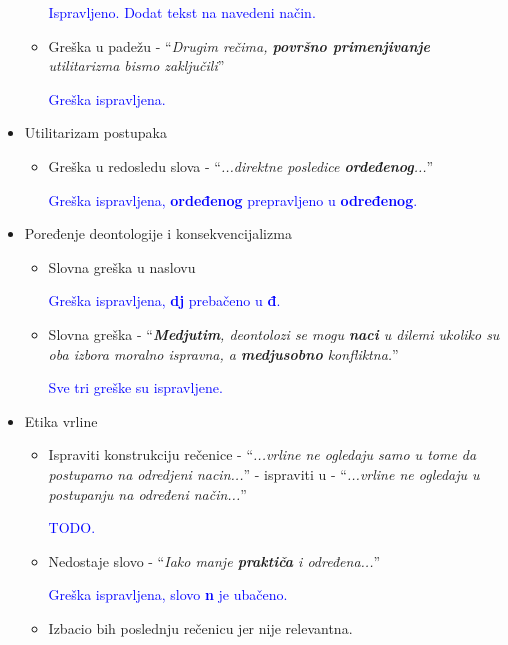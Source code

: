 \documentclass[a4paper]{report}
\newcommand{\odgovor}[1]{\textcolor{blue}{#1}}
\begin{document}
\begin{itemize}
\begin{itemize}
	\odgovor{Ispravljeno. Dodat tekst na navedeni način.}
	
    \item Greška u padežu - ``\textit{Drugim rečima,
\textbf{površno primenjivanje} utilitarizma bismo zaključili}''

	\odgovor{Greška ispravljena.}

    \end{itemize}
    \item Utilitarizam postupaka
    \begin{itemize}
        \item Greška u redosledu slova - ``\textit{...direktne posledice \textbf{ordeđenog}...}''
        
        \odgovor{Greška ispravljena, \textbf{ordeđenog} prepravljeno u \textbf{određenog}.}
        
    \end{itemize}
    \item Poređenje deontologije i konsekvencijalizma
    \begin{itemize}
        \item Slovna greška u naslovu
        
        \odgovor{Greška ispravljena, \textbf{dj} prebačeno u \textbf{đ}.}
        
        \item Slovna greška - ``\textit{\textbf{Medjutim}, deontolozi se mogu \textbf{naci} u dilemi ukoliko su oba izbora
moralno ispravna, a \textbf{medjusobno} konfliktna.}''

		\odgovor{Sve tri greške su ispravljene.}

    \end{itemize}
    \item Etika vrline
    \begin{itemize}
        \item Ispraviti konstrukciju rečenice - ``\textit{...vrline ne ogledaju samo u tome da postupamo na odredjeni nacin...}''
        - ispraviti u - ``\textit{...vrline ne ogledaju u postupanju na određeni način...}'' 
        
        \odgovor{TODO.}
        
        \item Nedostaje slovo - ``\textit{Iako manje \textbf{praktiča} i određena...}''

        \odgovor{Greška ispravljena, slovo \textbf{n} je ubačeno.}

        \item Izbacio bih poslednju rečenicu jer nije relevantna.
        

\end{itemize}
\end{itemize}
\end{document}
